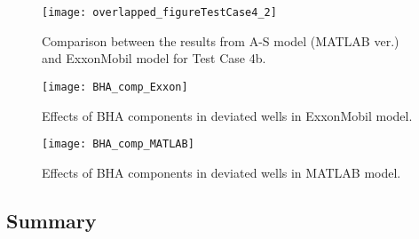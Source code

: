 \begin{figure}
  \centering
  \texttt{[image: overlapped\_figureTestCase4\_2]}
  \caption[Comparison of the results for Test Case 4b]{Comparison between the results from A-S model (MATLAB ver.) and ExxonMobil model for Test Case 4b.}\label{figure_testcase4_2_overlapped}
\end{figure}

\begin{figure}
  \centering
  \texttt{[image: BHA\_comp\_Exxon]}
  \caption[Effects of BHA components (ExxonMobil model)]{Effects of BHA components in deviated wells in ExxonMobil model. }\label{figure_BHA_EXXON}
\end{figure}

\begin{figure}
  \centering
  \texttt{[image: BHA\_comp\_MATLAB]}
  \caption[Effects of BHA components (MATLAB model)]{Effects of BHA components in deviated wells in MATLAB model. }\label{figure_BHA_MATLAB}
\end{figure}

\subsection{Summary} 